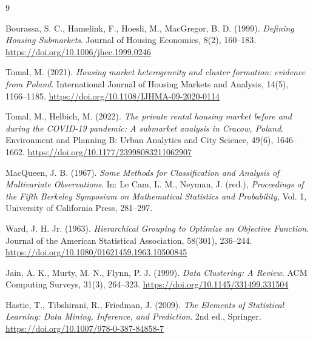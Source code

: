 \documentclass{report}
\begin{document}
\begin{thebibliography}{9}

Bourassa, S. C., Hamelink, F., Hoesli, M., MacGregor, B. D. (1999).
\textit{Defining Housing Submarkets}.
Journal of Housing Economics, 8(2), 160--183.
\url{https://doi.org/10.1006/jhec.1999.0246}

Tomal, M. (2021).
\textit{Housing market heterogeneity and cluster formation: evidence from Poland}.
International Journal of Housing Markets and Analysis, 14(5), 1166--1185.
\url{https://doi.org/10.1108/IJHMA-09-2020-0114}

Tomal, M., Helbich, M. (2022).
\textit{The private rental housing market before and during the COVID-19 pandemic: A submarket analysis in Cracow, Poland}.
Environment and Planning B: Urban Analytics and City Science, 49(6), 1646--1662.
\url{https://doi.org/10.1177/23998083211062907}

MacQueen, J. B. (1967).
\textit{Some Methods for Classification and Analysis of Multivariate Observations}.
In: Le Cam, L. M., Neyman, J. (red.),
\textit{Proceedings of the Fifth Berkeley Symposium on Mathematical Statistics and Probability},
Vol. 1, University of California Press, 281--297.

Ward, J. H. Jr. (1963).
\textit{Hierarchical Grouping to Optimize an Objective Function}.
Journal of the American Statistical Association, 58(301), 236--244.
\url{https://doi.org/10.1080/01621459.1963.10500845}

Jain, A. K., Murty, M. N., Flynn, P. J. (1999).
\textit{Data Clustering: A Review}.
ACM Computing Surveys, 31(3), 264--323.
\url{https://doi.org/10.1145/331499.331504}

Hastie, T., Tibshirani, R., Friedman, J. (2009).
\textit{The Elements of Statistical Learning: Data Mining, Inference, and Prediction}.
2nd ed., Springer.
\url{https://doi.org/10.1007/978-0-387-84858-7}

\end{thebibliography}
\end{document}
